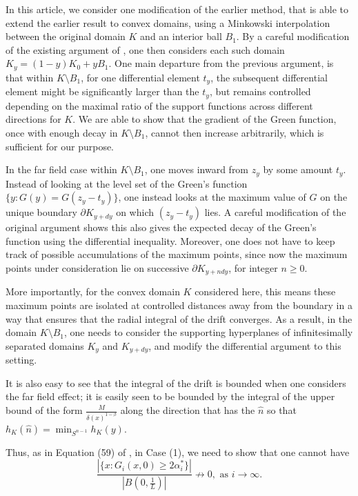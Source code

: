 \documentclass{article}
\newcounter{lem}
\theoremstyle{plain}
\theoremstyle{definition}
\theoremstyle{plain}
\begin{document}
In this article, we consider one modification of the earlier method, that is able to extend the earlier result to convex domains, using a Minkowski interpolation between the original domain $K$ and an interior ball $B_1$. By a careful modification of the existing argument of \cite{Pat25}, one then considers each such domain $K_y = (1-y)K_0 + y B_1$. One main departure from the previous argument, is that within $K\setminus B_1$, for one differential element $t_y$, the subsequent differential element might be significantly larger than the $t_y$, but remains controlled depending on the maximal ratio of the support functions across different directions for $K$. We are able to show that the gradient of the Green function, once with enough decay in $K\setminus B_1$, cannot then increase arbitrarily, which is sufficient for our purpose. 

In the far field case within $K\setminus B_1$, one moves inward from $z_y$ by some amount $t_y$. Instead of looking at the level set of the Green's function $\{y : G(y) = G(z_y - t_y)\}$, one instead looks at the maximum value of $G$ on the unique boundary $\partial K_{y+dy}$ on which $(z_y - t_y)$ lies. A careful modification of the original argument shows this also gives the expected decay of the Green's function using the differential inequality. Moreover, one does not have to keep track of possible accumulations of the maximum points, since now the maximum points under consideration lie on successive $\partial K_{y+ndy}$, for integer $n \ge 0$.

More importantly, for the convex domain $K$ considered here, this means these maximum points are isolated at controlled distances away from the boundary in a way that ensures that the radial integral of the drift converges. As a result, in the domain $K \setminus B_1$, one needs to consider the supporting hyperplanes of infinitesimally separated domains $K_y$ and $K_{y+dy}$, and modify the differential argument to this setting.

It is also easy to see that the integral of the drift is bounded when one considers the far field effect; it is easily seen to be bounded by the integral of the upper bound of the form $\frac{M}{\delta(x)^{1-\beta}}$ along the direction that has the $\hat{n}$ so that $h_K(\hat{n}) = \min_{S^{n-1}} h_K(y)$.

Thus, as in Equation (59) of \cite{Pat25}, in Case (1), we need to show that one cannot have 
$$\frac{|\{x : G_i(x, 0) \ge 2\alpha_i^*\}|}{|B(0, \frac{1}{L})|} \not\to 0, \text{ as } i \to \infty.$$
\end{document}
